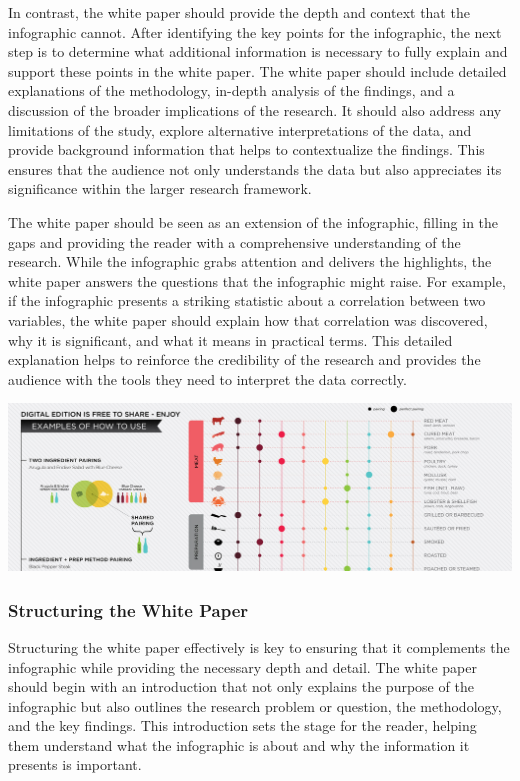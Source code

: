 \documentclass[
]{book}
\begin{document}
In contrast, the white paper should provide the depth and context that the infographic cannot. After identifying the key points for the infographic, the next step is to determine what additional information is necessary to fully explain and support these points in the white paper. The white paper should include detailed explanations of the methodology, in-depth analysis of the findings, and a discussion of the broader implications of the research. It should also address any limitations of the study, explore alternative interpretations of the data, and provide background information that helps to contextualize the findings. This ensures that the audience not only understands the data but also appreciates its significance within the larger research framework.

The white paper should be seen as an extension of the infographic, filling in the gaps and providing the reader with a comprehensive understanding of the research. While the infographic grabs attention and delivers the highlights, the white paper answers the questions that the infographic might raise. For example, if the infographic presents a striking statistic about a correlation between two variables, the white paper should explain how that correlation was discovered, why it is significant, and what it means in practical terms. This detailed explanation helps to reinforce the credibility of the research and provides the audience with the tools they need to interpret the data correctly.

\href{https://winefolly.com/deep-dive/simple-food-and-wine-pairing/}{\includegraphics[width=1\linewidth,height=\textheight,keepaspectratio]{images/infographic.jpg}}

\subsubsection*{Structuring the White Paper}\label{structuring-the-white-paper}

Structuring the white paper effectively is key to ensuring that it complements the infographic while providing the necessary depth and detail. The white paper should begin with an introduction that not only explains the purpose of the infographic but also outlines the research problem or question, the methodology, and the key findings. This introduction sets the stage for the reader, helping them understand what the infographic is about and why the information it presents is important.
\end{document}
